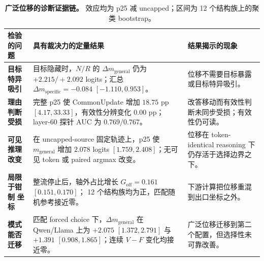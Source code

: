 \documentclass[UTF8,letterpaper,10pt,twocolumn]{ctexart}
\begin{document}
\begin{table}[t]
\centering
\small
\setlength{\tabcolsep}{4pt}
\renewcommand{\arraystretch}{1.12}
\begin{tabular}{@{}L{0.20\textwidth}L{0.38\textwidth}L{0.34\textwidth}@{}}
\toprule
检验的问题 & 具有裁决力的定量结果 & 结果揭示的现象 \\
\midrule

\textbf{目标特异}\newline
\textbf{吸引}
&
目标隐藏时，$N/R$ 的 $\Delta m_{\mathrm{general}}$
仍为 $+2.215/+2.092$ logits；汇总
$\Delta m_{\mathrm{specific}}=-0.084$ $[-1.110,0.953]$。
&
位移不需要目标暴露或目标特异吸引。
\\

\addlinespace

\textbf{理由判断}\newline
\textbf{受损}
&
完整 p25 使 CommonUpdate 增加 $18.75$ pp
$[4.17,33.33]$，有效性分辨变化 $0.00$ pp；
layer-60 探针 AUC 为 $0.769/0.767$。
&
改答移动而有效性判断未同步受损；有效性仍可读。
\\

\addlinespace

\textbf{可见推理}\newline
\textbf{改变}
&
在 uncapped-source 固定轨迹上，p25 使
$m_{\mathrm{general}}$ 增加 $2.078$ logits
$[1.759,2.408]$；无可见 token 或 paired argmax 改变。
&
位移在 token-identical reasoning 下仍存活于选择边界之下。
\\

\addlinespace

\textbf{局限于钳制}\newline
\textbf{坐标}
&
整流停止后，轴外占比增长
$G_{\mathrm{off}}=0.161$ $[0.151,0.170]$；
12 个结构族均为正，匹配随机参考接近零。
&
下游计算把位移重混到出口坐标之外。
\\

\addlinespace

\textbf{模式能否}\newline
\textbf{迁移}
&
匹配 forced choice 下，$\Delta m_{\mathrm{general}}$
在 Qwen/Llama 上为 $+2.075$ $[1.372,2.791]$ 与
$+1.391$ $[0.908,1.865]$；连续 $V-F$ 变化均接近零。
&
广泛位移迁移到第二个配置，但选择性未可靠改善。
\\

\bottomrule
\end{tabular}
\caption{\textbf{广泛位移的诊断证据链。} 效应均为 p25 减 uncapped；区间为 12 个结构族上的聚类 bootstrap。}
\label{tab:diagnostic-chain-zh}
\end{table}
\end{document}
